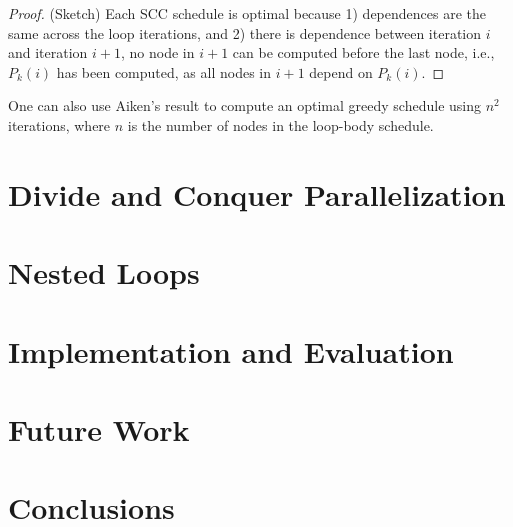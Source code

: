 \documentclass[sigconf, screen, natbib=false, dvipsnames, table]{acmart}
\theoremstyle{definition}
\begin{document}
\begin{proof} (Sketch)
Each SCC schedule is optimal because 1) dependences are the same across the loop iterations, and 2) there is dependence between 
iteration $i$ and iteration $i+1$, no node in $i+1$ can be computed before the last node, i.e., $P_k(i)$ has been computed, as all 
nodes in $i+1$ depend on $P_k(i)$. 
\end{proof}

One can also use Aiken's result to compute an optimal greedy schedule using $n^2$ iterations, where $n$ is the number of nodes 
in the loop-body schedule. 

\section{Divide and Conquer Parallelization}
\label{sec:divide}


\section{Nested Loops}

\section{Implementation and Evaluation}
\label{sec:implementation}


\section{Future Work}
\label{sec:implementation_and_benchmarks}
%
%

\section{Conclusions}
\label{sec:conclusion}
%


\printbibliography

\end{document}
